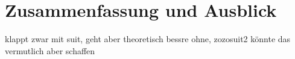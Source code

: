 \chapter{Zusammenfassung und Ausblick}

klappt zwar mit suit, geht aber theoretisch bessre ohne, zozosuit2 könnte das vermutlich aber schaffen